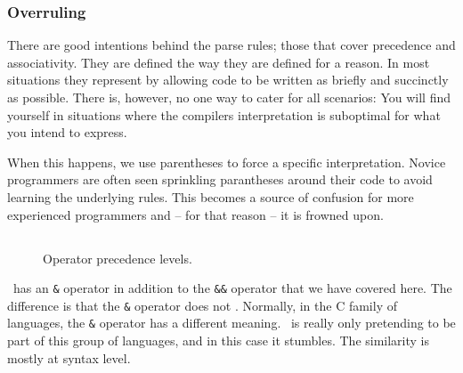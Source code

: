 \subsubsection{Overruling}

There are good intentions behind the parse rules; those that cover precedence and associativity. They are defined the way they are defined for a reason. In most situations they represent  by allowing code to be written as briefly and succinctly as possible. There is, however, no one way to cater for all scenarios: You will find yourself in situations where the compilers interpretation is suboptimal for what you intend to express.

When this happens, we use parentheses to force a specific interpretation. Novice programmers are often seen sprinkling parantheses around their code to avoid learning the underlying rules. This becomes a source of confusion for more experienced programmers and -- for that reason -- it is frowned upon.

\subsection{\csharp}


\begin{syntaxfloat}
  
  \caption{Expressions of parentheses}
  \label{syntax:prim:pars}
\end{syntaxfloat}

\begin{figure}[tbp]
  
  \caption{Operator precedence levels.}
  \label{fig:prim:op:precedence}
\end{figure}

\begin{caution}
\csharp\ has an \texttt{\&} operator in addition to the \texttt{\&\&} operator that we have covered here. The difference is that the \texttt{\&} operator does not . Normally, in the C family of languages, the \texttt{\&} operator has a different meaning. \csharp\ is really only pretending to be part of this group of languages, and in this case it stumbles. The similarity is mostly at syntax level.
\end{caution}

